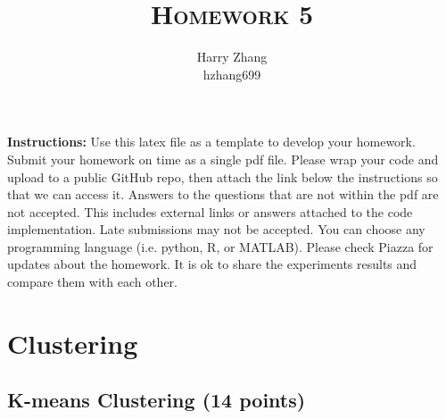 \documentclass[a4paper]{article}
\title{\textsc{Homework 5}} %
\author{
Harry Zhang\\
hzhang699\\
}
\date{}
\theoremstyle{definition}
\begin{document}
\maketitle 


\textbf{Instructions:}
Use this latex file as a template to develop your homework. Submit your homework on time as a single pdf file. Please wrap your code and upload to a public GitHub repo, then attach the link below the instructions so that we can access it. Answers to the questions that are not within the pdf are not accepted. This includes external links or answers attached to the code implementation. Late submissions may not be accepted. You can choose any programming language (i.e. python, R, or MATLAB). Please check Piazza for updates about the homework. It is ok to share the experiments results and compare them with each other.

\vspace{0.1in}


\section{Clustering}

\subsection{K-means Clustering (14 points)}
\end{document}

